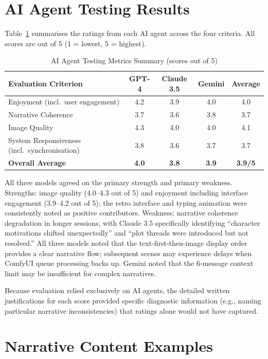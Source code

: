 \documentclass[12pt,a4paper]{article}
\begin{document}
\section{AI Agent Testing Results}

Table~\ref{tab:ai_testing_metrics} summarises the ratings from each AI agent across the four criteria. All scores are out of 5 (1 = lowest, 5 = highest).

\begin{table}[H]
\centering
\caption{AI Agent Testing Metrics Summary (scores out of 5)}
\label{tab:ai_testing_metrics}
\begin{tabular}{lcccc}
\toprule
\textbf{Evaluation Criterion} & \textbf{GPT-4} & \textbf{Claude 3.5} & \textbf{Gemini} & \textbf{Average} \\
\midrule
Enjoyment (incl.\ user engagement) & 4.2 & 3.9 & 4.0 & 4.0 \\
Narrative Coherence & 3.7 & 3.6 & 3.8 & 3.7 \\
Image Quality & 4.3 & 4.0 & 4.0 & 4.1 \\
System Responsiveness (incl.\ synchronisation) & 3.8 & 3.6 & 3.7 & 3.7 \\
\midrule
\textbf{Overall Average} & \textbf{4.0} & \textbf{3.8} & \textbf{3.9} & \textbf{3.9/5} \\
\bottomrule
\end{tabular}
\end{table}

All three models agreed on the primary strength and primary weakness. Strengths: image quality (4.0--4.3 out of 5) and enjoyment including interface engagement (3.9--4.2 out of 5); the retro interface and typing animation were consistently noted as positive contributors. Weakness: narrative coherence degradation in longer sessions, with Claude 3.5 specifically identifying ``character motivations shifted unexpectedly'' and ``plot threads were introduced but not resolved.'' All three models noted that the text-first-then-image display order provides a clear narrative flow; subsequent scenes may experience delays when ComfyUI queue processing backs up. Gemini noted that the 6-message context limit may be insufficient for complex narratives.

Because evaluation relied exclusively on AI agents, the detailed written justifications for each score provided specific diagnostic information (e.g., naming particular narrative inconsistencies) that ratings alone would not have captured.

\section{Narrative Content Examples}
\end{document}
